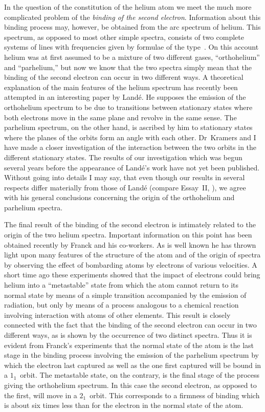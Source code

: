 In the question of the constitution of the helium atom we meet
the much more complicated problem of the \emph{binding of the second
electron}. Information about this binding process may, however, be
obtained from the arc spectrum of helium. This spectrum, as
opposed to most other simple spectra, consists of two complete
systems of lines with frequencies given by formulae of the type~.
On this account helium was at first assumed to be a mixture
of two different gases, ``orthohelium'' and ``parhelium,'' but now we
know that the two spectra simply mean that the binding of the second
electron can occur in two different ways. A theoretical explanation of
the main features of the helium spectrum has recently been attempted
in an interesting paper by Landé. He supposes the emission of the
orthohelium spectrum to be due to transitions between stationary
states where both electrons move in the same plane and revolve
in the same sense. The parhelium spectrum, on the other hand, is
ascribed by him to stationary states where the planes of the orbits
form an angle with each other. Dr~Kramers and I have made a
closer investigation of the interaction between the two orbits in
the different stationary states. The results of our investigation
which was begun several years before the appearance of Landé's
work have not yet been published. Without going into details
I may say, that even though our results in several respects differ
materially from those of Landé (compare Essay~II, ), we agree
with his general conclusions concerning the origin of the orthohelium
and parhelium spectra.

The final result of the binding of the second electron is intimately
related to the origin of the two helium spectra. Important
information on this point has been obtained recently by Franck
and his co-workers. As is well known he has thrown light upon
many features of the structure of the atom and of the origin
of spectra by observing the effect of bombarding atoms by
electrons of various velocities. A short time ago these experiments
showed that the impact of electrons could bring helium into a
``metastable'' state from which the atom cannot return to its
normal state by means of a simple transition accompanied by the
emission of radiation, but only by means of a process analogous to
a chemical reaction involving interaction with atoms of other
elements. This result is closely connected with the fact that the
binding of the second electron can occur in two different ways, as
is shown by the occurrence of two distinct spectra. Thus it is
evident from Franck's experiments that the normal state of the
atom is the last stage in the binding process involving the emission
of the parhelium spectrum by which the electron last captured as
well as the one first captured will be bound in a $1_{1}$~orbit. The
metastable state, on the contrary, is the final stage of the process
giving the orthohelium spectrum. In this case the second electron,
as opposed to the first, will move in a $2_{1}$~orbit. This corresponds to
a firmness of binding which is about six times less than for the
electron in the normal state of the atom.

